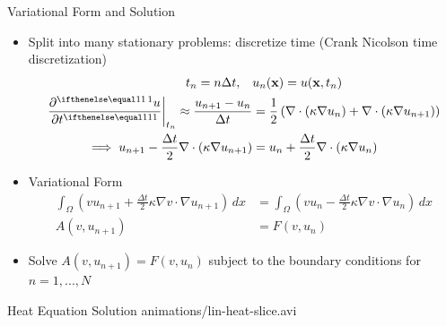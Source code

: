 \documentclass[serif]{beamer}
\begin{document}
\begin{frame}{Variational Form and Solution}
    \begin{itemize}
				\item Split into many stationary problems: discretize time (Crank Nicolson time discretization)
        \[\begin{split}
            t_n = n\Delta t, \quad & u_n(\vec x) = u(\vec x, t_n) \\
            \left.\pder{u}{t}\right|_{t_n} \approx \frac{u_{n+1} - u_n}{\Delta t} & = 
            \frac{1}{2} \left(\nabla \cdot (\kappa \nabla u_n) + \nabla \cdot (\kappa \nabla u_{n+1})\right)\\
            \implies u_{n+1} - \frac{\Delta t}{2} \nabla \cdot (\kappa \nabla u_{n+1}) & = 
            u_n + \frac{\Delta t}{2} \nabla \cdot (\kappa \nabla u_n)
        \end{split}\]

        \item Variational Form
        \[\begin{split}
					\int_\Omega \left(v u_{n+1} + \frac{\Delta t}{2} \kappa \nabla v \cdot \nabla u_{n+1}\right) \, dx & = 
					\int_\Omega \left(vu_n - \frac{\Delta t}{2} \kappa \nabla v \cdot \nabla u_n \right) \, dx \\
					A(v, u_{n+1}) & = F(v, u_n)
				\end{split}\]
        
        \item Solve $A(v, u_{n+1}) = F(v, u_n)$ subject to the boundary conditions
					for $n = 1, ..., N$
    \end{itemize}
\end{frame}

\begin{frame}{Heat Equation Solution}
		\centering
		{animations/lin-heat-slice.avi}
\end{frame}
\end{document}
